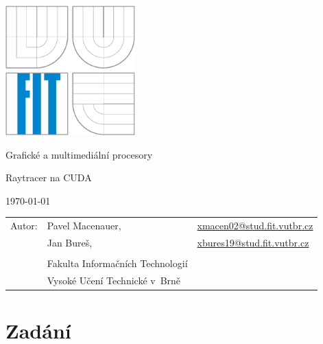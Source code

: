 \documentclass[12pt,a4paper,titlepage,final]{report}
\makeatletter
\newcommand\Course{Grafické a multimediální procesory}
\newcommand\WorkTitle{Raytracer na CUDA}
\newcommand\AuthorA{Pavel Macenauer}
\newcommand\AuthorB{Jan Bureš}
\newcommand\AuthorAEmail{xmacen02@stud.fit.vutbr.cz}
\newcommand\AuthorBEmail{xbures19@stud.fit.vutbr.cz}
\newcommand\Faculty{Fakulta Informačních Technologií}
\newcommand\School{Vysoké Učení Technické v~Brně}
\makeatother
\begin{document}
	\begin{titlepage}
	\begin{center}
		\includegraphics[height=5cm]{images/logo.eps}
	\end{center}
	\vfill
	\begin{center}
		\begin{Large}
			\Course\\
		\end{Large}
		\bigskip
		\begin{Huge}
			\WorkTitle\\
		\end{Huge}
	\end{center}
	\vfill
	\begin{center}
		\begin{large}
			\today
		\end{large}
	\end{center}
	\vfill
	\begin{flushleft}
		\begin{large}
			\begin{tabular}{lll}
				Autor: & \AuthorA, & \url{\AuthorAEmail} \\
				& \AuthorB, & \url{\AuthorBEmail} \\
		
				& & \\
				& \Faculty \\
				& \School \\
			\end{tabular}
		\end{large}
	\end{flushleft}
\end{titlepage}		

\tableofcontents

\newpage

\section{Zadání}
\end{document}
